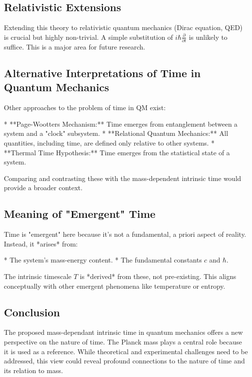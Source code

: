 \documentclass{article}
\begin{document}
{{{{				\subsection{Relativistic Extensions}
				
				Extending this theory to relativistic quantum mechanics (Dirac equation, QED) is crucial but highly non-trivial.  A simple substitution of $i\hbar \frac{\partial}{\partial t}$ is unlikely to suffice.  This is a major area for future research.
				
				\subsection{Alternative Interpretations of Time in Quantum Mechanics}
				
				Other approaches to the problem of time in QM exist:
				
				*   **Page-Wootters Mechanism:** Time emerges from entanglement between a system and a "clock" subsystem.
				*   **Relational Quantum Mechanics:** All quantities, including time, are defined only relative to other systems.
				*   **Thermal Time Hypothesis:** Time emerges from the statistical state of a system.
				
				Comparing and contrasting these with the mass-dependent intrinsic time would provide a broader context.
				
				\subsection{Meaning of "Emergent" Time}
				
				Time is "emergent" here because it's not a fundamental, a priori aspect of reality. Instead, it *arises* from:
				
				*   The system's mass-energy content.
				*   The fundamental constants $c$ and $\hbar$.
				
				The intrinsic timescale $T$ is *derived* from these, not pre-existing. This aligns conceptually with other emergent phenomena like temperature or entropy.
				
				\subsection{Conclusion}
				The proposed mass-dependant intrinsic time in quantum mechanics offers a new perspective on the nature of time. The Planck mass plays a central role because it is used as a reference. While theoretical and experimental challenges need to be addressed, this view could reveal profound connections to the nature of time and its relation to mass.

}}}}
\end{document}
